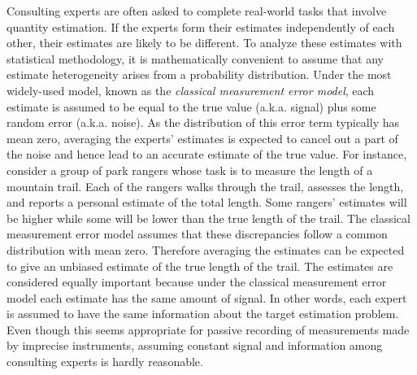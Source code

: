 \documentclass[11pt,twoside]{article}
\begin{document}
Consulting experts are often asked to complete real-world tasks that involve quantity estimation. If the experts form their estimates independently of each
other, their estimates are likely to be different. To analyze these
estimates with statistical methodology, it is mathematically
convenient to assume that any estimate heterogeneity arises
from a probability distribution. Under the most widely-used model, known as the \textit{classical measurement error model}, each estimate is assumed to be equal to the true value (a.k.a. signal) plus some random error (a.k.a. noise). As the distribution of this error term typically has mean zero, averaging the experts' estimates is expected to cancel out a part of the noise and hence lead to an accurate estimate of the true value. For instance, consider a group of park rangers whose task is to measure the length of a mountain trail. Each of the rangers walks through the trail, assesses the length, and reports a personal estimate of the total length. Some rangers' estimates will be higher while some will be lower than the true length of the trail. The classical measurement error model assumes that these discrepancies follow a common distribution with mean zero. Therefore averaging the estimates can be expected to give an unbiased estimate of the true length of the trail. The estimates are considered equally important because 
under the classical measurement error model each estimate has the same amount of signal. In other words, each expert is assumed to have the same information about the target estimation problem. Even though this seems appropriate for passive recording of measurements made by imprecise instruments, assuming constant signal and information among consulting experts is hardly reasonable. 
\end{document}
